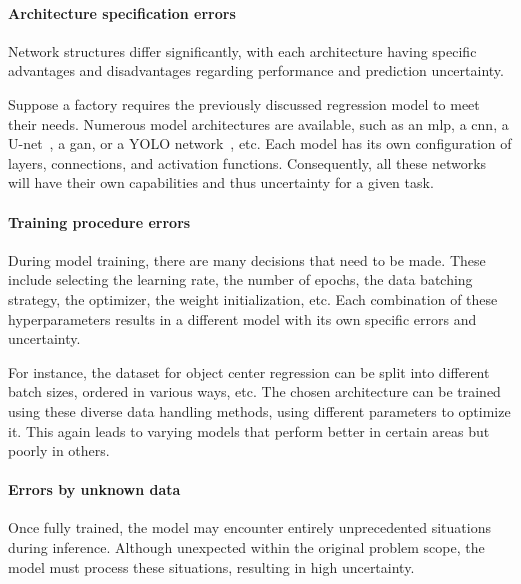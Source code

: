 \paragraph{Architecture specification errors} \label{ch:literature-study_section:uncertainty-in-ai_subsection:epistemic-uncertainty_paragraph:architecture-specification-errors}
Network structures differ significantly, with each architecture having specific advantages and disadvantages regarding performance and prediction uncertainty.

Suppose a factory requires the previously discussed regression model to meet their needs.
Numerous model architectures are available, such as an \gls{mlp}, a \gls{cnn}, a U-net~\cite{src:u-net}, a \gls{gan}, or a YOLO network~\cite{src:yolo}, etc.
Each model has its own configuration of layers, connections, and activation functions.
Consequently, all these networks will have their own capabilities and thus uncertainty for a given task.

\paragraph{Training procedure errors} \label{ch:literature-study_section:uncertainty-in-ai_subsection:epistemic-uncertainty_paragraph:training-procedure-errors}
During model training, there are many decisions that need to be made.
These include selecting the learning rate, the number of epochs, the data batching strategy, the optimizer, the weight initialization, etc.
Each combination of these hyperparameters results in a different model with its own specific errors and uncertainty.

For instance, the dataset for object center regression can be split into different batch sizes, ordered in various ways, etc.
The chosen architecture can be trained using these diverse data handling methods, using different parameters to optimize it.
This again leads to varying models that perform better in certain areas but poorly in others.

\paragraph{Errors by unknown data} \label{ch:literature-study_section:uncertainty-in-ai_subsection:epistemic-uncertainty_paragraph:errors-by-unknown-data}
Once fully trained, the model may encounter entirely unprecedented situations during inference.
Although unexpected within the original problem scope, the model must process these situations, resulting in high uncertainty.

